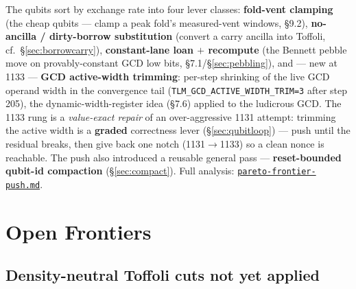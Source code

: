 \documentclass[11pt,a4paper]{article}
\begin{document}
The qubits sort by exchange rate into four lever classes: \textbf{fold-vent clamping} (the cheap
qubits --- clamp a peak fold's measured-vent windows, \S9.2), \textbf{no-ancilla / dirty-borrow
substitution} (convert a carry ancilla into Toffoli, cf.\ \S\ref{sec:borrowcarry}),
\textbf{constant-lane loan $+$ recompute} (the Bennett pebble move on provably-constant GCD low bits,
\S7.1/\S\ref{sec:pebbling}), and --- new at 1133 --- \textbf{GCD active-width trimming}: per-step
shrinking of the live GCD operand width in the convergence tail
(\texttt{TLM\_GCD\_ACTIVE\_WIDTH\_TRIM=3} after step 205), the dynamic-width-register idea (\S7.6)
applied to the ludicrous GCD. The 1133 rung is a \emph{value-exact repair} of an over-aggressive 1131
attempt: trimming the active width is a \textbf{graded} correctness lever (\S\ref{sec:qubitloop}) ---
push until the residual breaks, then give back one notch (1131$\to$1133) so a clean nonce is
reachable. The push also introduced a reusable general pass --- \textbf{reset-bounded qubit-id
compaction} (\S\ref{sec:compact}). Full analysis:
\href{https://github.com/jieyilong/ecdsafail_skills/blob/main/ecdsafail-circuit-optimization/references/pareto-frontier-push.md}{\texttt{pareto-frontier-push.md}}.

\section{Open Frontiers}
\label{sec:frontiers}

\subsection{Density-neutral Toffoli cuts not yet applied}
\end{document}
